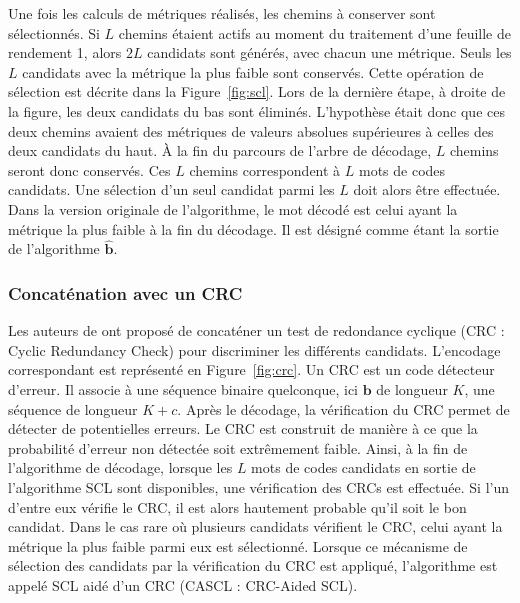 Une fois les calculs de métriques réalisés, les chemins à conserver sont sélectionnés. Si $L$ chemins étaient actifs au moment du traitement d'une feuille de rendement 1, alors $2L$ candidats sont générés, avec chacun une métrique. Seuls les $L$ candidats avec la métrique la plus faible sont conservés. Cette opération de sélection est décrite dans la Figure~\ref{fig:scl}. Lors de la dernière étape, à droite de la figure, les deux candidats du bas sont éliminés. L'hypothèse était donc que ces deux chemins avaient des métriques de valeurs absolues supérieures à celles des deux candidats du haut. \`A la fin du parcours de l'arbre de décodage, $L$ chemins seront donc conservés. Ces $L$ chemins correspondent à $L$ mots de codes candidats. Une sélection d'un seul candidat parmi les $L$ doit alors être effectuée. Dans la version originale de l'algorithme, le mot décodé est celui ayant la métrique la plus faible à la fin du décodage. Il est désigné comme étant la sortie de l'algorithme $\mathbold{\hat{b}}$.


\subsubsection{Concaténation avec un CRC}

Les auteurs de \cite{tal_how_2013} ont proposé de concaténer un test de redondance cyclique (CRC : Cyclic Redundancy Check) pour discriminer les différents candidats. L'encodage correspondant est représenté en Figure~\ref{fig:crc}. Un CRC est un code détecteur d'erreur. Il associe à une séquence binaire quelconque, ici $\mathbold{b}$ de longueur $K$, une séquence de longueur $K+c$. Après le décodage, la vérification du CRC permet de détecter de potentielles erreurs. Le CRC est construit de manière à ce que la probabilité d'erreur non détectée soit extrêmement faible.
Ainsi, à la fin de l'algorithme de décodage, lorsque les $L$ mots de codes candidats en sortie de l'algorithme SCL sont disponibles, une vérification des CRCs est effectuée. Si l'un d'entre eux vérifie le CRC, il est alors hautement probable qu'il soit le bon candidat. Dans le cas rare où plusieurs candidats vérifient le CRC, celui ayant la métrique la plus faible parmi eux est sélectionné. Lorsque ce mécanisme de sélection des candidats par la vérification du CRC est appliqué, l'algorithme est appelé \og SCL aidé d'un CRC \fg (CASCL : CRC-Aided SCL).

